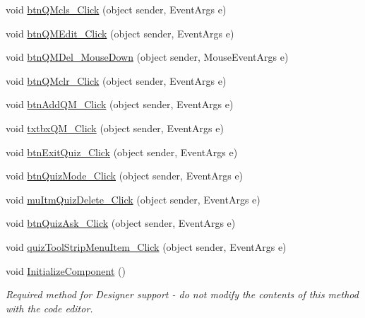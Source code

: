 \begin{DoxyCompactItemize}
void \hyperlink{class_sr_p___classroom_inq_1_1frm_classrrom_inq_a6e7cdcc66d0d497b1692085fe08917cd}{btn\-Q\-Mcls\-\_\-\-Click} (object sender, \-Event\-Args e)
\item 
void \hyperlink{class_sr_p___classroom_inq_1_1frm_classrrom_inq_a4a6869439b020d8519e10076c9583ebc}{btn\-Q\-M\-Edit\-\_\-\-Click} (object sender, \-Event\-Args e)
\item 
void \hyperlink{class_sr_p___classroom_inq_1_1frm_classrrom_inq_ad0002b32188c4505254a9230dec7fc23}{btn\-Q\-M\-Del\-\_\-\-Mouse\-Down} (object sender, \-Mouse\-Event\-Args e)
\item 
void \hyperlink{class_sr_p___classroom_inq_1_1frm_classrrom_inq_a5ecd75c32680d8896b6fcada275b474b}{btn\-Q\-Mclr\-\_\-\-Click} (object sender, \-Event\-Args e)
\item 
void \hyperlink{class_sr_p___classroom_inq_1_1frm_classrrom_inq_a61c2d094a64b65ae8b2adbd206c90326}{btn\-Add\-Q\-M\-\_\-\-Click} (object sender, \-Event\-Args e)
\item 
void \hyperlink{class_sr_p___classroom_inq_1_1frm_classrrom_inq_ad6c1b79ff1d79865275fac5a258deb2a}{txtbx\-Q\-M\-\_\-\-Click} (object sender, \-Event\-Args e)
\item 
void \hyperlink{class_sr_p___classroom_inq_1_1frm_classrrom_inq_a80183bae83a721931c21b4a8764dc289}{btn\-Exit\-Quiz\-\_\-\-Click} (object sender, \-Event\-Args e)
\item 
void \hyperlink{class_sr_p___classroom_inq_1_1frm_classrrom_inq_acfcbbf64f2bc2adf94eec18f45d2af2c}{btn\-Quiz\-Mode\-\_\-\-Click} (object sender, \-Event\-Args e)
\item 
void \hyperlink{class_sr_p___classroom_inq_1_1frm_classrrom_inq_ae486d5e846d21cf5c2616d4c0ad2e5bb}{mu\-Itm\-Quiz\-Delete\-\_\-\-Click} (object sender, \-Event\-Args e)
\item 
void \hyperlink{class_sr_p___classroom_inq_1_1frm_classrrom_inq_a62dfbfb357c98095e446b9a617c34ee9}{btn\-Quiz\-Ask\-\_\-\-Click} (object sender, \-Event\-Args e)
\item 
void \hyperlink{class_sr_p___classroom_inq_1_1frm_classrrom_inq_a73354017a84daba6bd3a574274f3904a}{quiz\-Tool\-Strip\-Menu\-Item\-\_\-\-Click} (object sender, \-Event\-Args e)
\item 
void \hyperlink{class_sr_p___classroom_inq_1_1frm_classrrom_inq_a35e5cf3f9f2a335041a9f3810bb11ae2}{\-Initialize\-Component} ()
\begin{DoxyCompactList}\small\item\em \-Required method for \-Designer support -\/ do not modify the contents of this method with the code editor. \end{DoxyCompactList}\end{DoxyCompactItemize}
